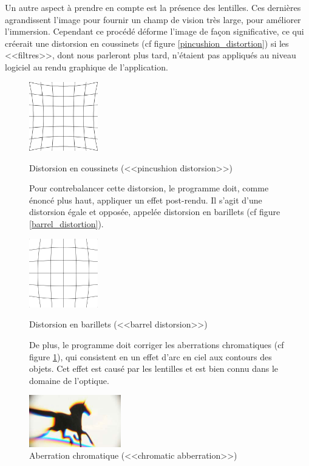 \documentclass[a4paper,french,12pt]{article}
\begin{document}
			    Un autre aspect à prendre en compte est la présence des lentilles. Ces dernières agrandissent
			    l'image pour fournir un champ de vision très large, pour améliorer l'immersion.
			    Cependant ce procédé déforme l'image de façon significative, ce qui créerait une distorsion
			    en coussinets (cf figure \ref{pincushion_distortion}) si les <<filtres>>, dont nous parleront plus tard,
			    n'étaient pas appliqués au niveau logiciel au rendu graphique de l'application.\\
			    \FloatBarrier
			    \begin{figure}[h!]
			      \centering
				\includegraphics[width=3cm]{pincushion_distortion.png}
			      \caption{Distorsion en coussinets (<<pincushion distorsion>>)}\par\medskip
			      \label{pincushion_distortion}
			    
			    \FloatBarrier
			    Pour contrebalancer cette distorsion, le programme doit, comme énoncé plus haut, appliquer
			    un effet post-rendu. Il s'agit d'une distorsion égale et opposée, appelée distorsion en 
			    barillets (cf figure \ref{barrel_distortion}).\par\bigskip
			    
			    {
			      \centering
				\includegraphics[width=3cm]{barrel_distortion.png}
			      \caption{Distorsion en barillets (<<barrel distorsion>>)}
			      \label{barrel_distortion}
			    }\par\medskip
			    \FloatBarrier
			    De plus, le programme doit corriger les aberrations chromatiques (cf figure \ref{chromatic_aberration}), qui consistent en un effet
			    d'arc en ciel aux contours des objets. Cet effet est causé par les lentilles et est
			    bien connu dans le domaine de l'optique.\par\bigskip
			    \FloatBarrier
			  {
			      \centering
				\includegraphics[width=4cm]{chromatic_aberration.jpg}
			      \caption{Aberration chromatique (<<chromatic abberration>>)}
			      \label{chromatic_aberration}
			  }
			    \end{figure}  ~ \\
			    
\end{document}

